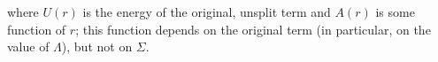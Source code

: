 where $U(r)$ is the energy of the original, unsplit term and $A(r)$ is some function of $r$; this function depends on the original term (in particular, on the value of $\Lambda$), but not on $\Sigma$.
